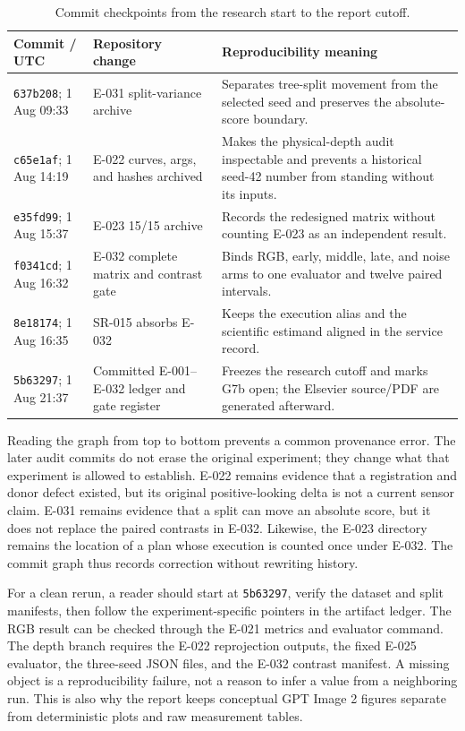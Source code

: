 \documentclass[preprint,12pt]{elsarticle}
\begin{document}
\begin{table}[H]
\centering\small
\caption{Commit checkpoints from the research start to the report cutoff.}
\label{tab:commit-chronology}
\begin{tabularx}{\columnwidth}{L{0.16\columnwidth}L{0.18\columnwidth}Y}
\toprule
Commit / UTC & Repository change & Reproducibility meaning\\
\midrule
\texttt{637b208}; 1 Aug 09:33 & E-031 split-variance archive & Separates tree-split movement from the selected seed and preserves the absolute-score boundary.\\
\texttt{c65e1af}; 1 Aug 14:19 & E-022 curves, args, and hashes archived & Makes the physical-depth audit inspectable and prevents a historical seed-42 number from standing without its inputs.\\
\texttt{e35fd99}; 1 Aug 15:37 & E-023 15/15 archive & Records the redesigned matrix without counting E-023 as an independent result.\\
\texttt{f0341cd}; 1 Aug 16:32 & E-032 complete matrix and contrast gate & Binds RGB, early, middle, late, and noise arms to one evaluator and twelve paired intervals.\\
\texttt{8e18174}; 1 Aug 16:35 & SR-015 absorbs E-032 & Keeps the execution alias and the scientific estimand aligned in the service record.\\
\texttt{5b63297}; 1 Aug 21:37 & Committed E-001--E-032 ledger and gate register & Freezes the research cutoff and marks G7b open; the Elsevier source/PDF are generated afterward.\\
\bottomrule
\end{tabularx}
\end{table}

Reading the graph from top to bottom prevents a common provenance error. The
later audit commits do not erase the original experiment; they change what
that experiment is allowed to establish. E-022 remains evidence that a
registration and donor defect existed, but its original positive-looking
delta is not a current sensor claim. E-031 remains evidence that a split can
move an absolute score, but it does not replace the paired contrasts in
E-032. Likewise, the E-023 directory remains the location of a plan whose
execution is counted once under E-032. The commit graph thus records
correction without rewriting history.

For a clean rerun, a reader should start at \texttt{5b63297}, verify the
dataset and split manifests, then follow the experiment-specific pointers in
the artifact ledger. The RGB result can be checked through the E-021 metrics
and evaluator command. The depth branch requires the E-022 reprojection
outputs, the fixed E-025 evaluator, the three-seed JSON files, and the E-032
contrast manifest. A missing object is a reproducibility failure, not a
reason to infer a value from a neighboring run. This is also why the report
keeps conceptual GPT Image 2 figures separate from deterministic plots and
raw measurement tables.
\end{document}
